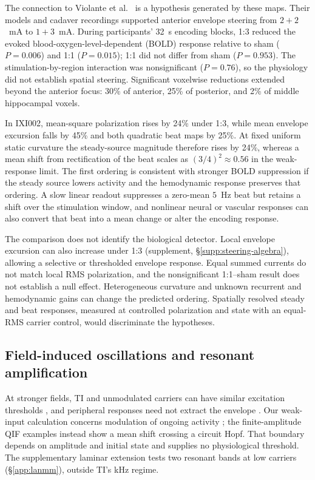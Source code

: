 \documentclass[a4paper]{article}
\newif\ifjne
\begin{document}
The connection to Violante et al.\ \cite{violante2023} is a hypothesis generated by these maps. Their models and cadaver recordings supported anterior envelope
steering from $2+2$~mA to $1+3$~mA. During participants' 32~s encoding blocks,
1:3 reduced the evoked blood-oxygen-level-dependent (BOLD) response relative
to sham ($P=0.006$) and 1:1 ($P=0.015$); 1:1 did not differ from sham
($P=0.953$). The stimulation-by-region interaction was nonsignificant
($P=0.76$), so the physiology did not establish spatial steering. Significant
voxelwise reductions extended beyond the anterior focus: 30\% of anterior,
25\% of posterior, and 2\% of middle hippocampal voxels.

In IXI002, mean-square polarization rises by 24\% under 1:3, while mean
envelope excursion falls by 45\% and both quadratic beat maps by 25\%.
At fixed uniform static curvature the steady-source magnitude therefore rises
by 24\%, whereas a mean shift from rectification of the beat scales as
$(3/4)^2\approx0.56$ in the weak-response limit. The first ordering is
consistent with stronger BOLD suppression if the steady source lowers activity
and the hemodynamic response preserves that ordering. A slow linear readout
suppresses a zero-mean $5$~Hz beat but retains a shift over the stimulation
window, and nonlinear neural or vascular responses can also convert that beat
into a mean change or alter the encoding response.

The comparison does not identify the biological detector. Local envelope excursion
can also increase under 1:3 (supplement, \S\ref{supp:steering-algebra}), allowing
a selective or thresholded envelope response. Equal summed currents do not match
local RMS polarization, and the nonsignificant 1:1--sham result does not establish
a null effect. Heterogeneous curvature and unknown recurrent and hemodynamic gains
can change the predicted ordering. Spatially resolved steady and beat responses,
measured at controlled polarization and state with an equal-RMS carrier control,
would discriminate the hypotheses.
\ifjne\else

\fi

\subsection{Field-induced oscillations and resonant amplification}
At stronger fields, TI and unmodulated carriers can have similar excitation
thresholds \cite{opancar2025,semenov2025}, and peripheral responses need not
extract the envelope \cite{peripheral2023}. Our weak-input calculation concerns
modulation of ongoing activity \cite{vieira2024}; the finite-amplitude QIF examples
instead show a mean shift crossing a circuit Hopf. That
boundary depends on amplitude and initial state and supplies no physiological
threshold. The supplementary laminar extension tests two resonant bands at low
carriers (\S\ref{app:lanmm}), outside TI's kHz regime.
\end{document}
